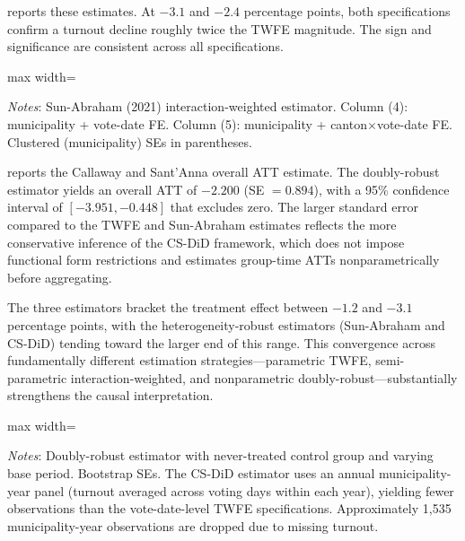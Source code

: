 \documentclass[12pt]{article}
\begin{document}
 reports these estimates. At $-3.1$ and $-2.4$ percentage points, both specifications confirm a turnout decline roughly twice the TWFE magnitude. The sign and significance are consistent across all specifications.

\begin{table}[H]
\centering
\caption{Sun-Abraham Interaction-Weighted Estimates}
\label{tab:sunab}
\begin{adjustbox}{max width=\textwidth}

\end{adjustbox}
\vspace{0.3em}
\parbox{\textwidth}{\footnotesize \textit{Notes}: Sun-Abraham (2021) interaction-weighted estimator. Column (4): municipality + vote-date FE. Column (5): municipality + canton$\times$vote-date FE. Clustered (municipality) SEs in parentheses.}
\end{table}

 reports the Callaway and Sant'Anna overall ATT estimate. The doubly-robust estimator yields an overall ATT of $-2.200$ (SE $= 0.894$), with a 95\% confidence interval of $[-3.951, -0.448]$ that excludes zero. The larger standard error compared to the TWFE and Sun-Abraham estimates reflects the more conservative inference of the CS-DiD framework, which does not impose functional form restrictions and estimates group-time ATTs nonparametrically before aggregating.

The three estimators bracket the treatment effect between $-1.2$ and $-3.1$ percentage points, with the heterogeneity-robust estimators (Sun-Abraham and CS-DiD) tending toward the larger end of this range. This convergence across fundamentally different estimation strategies---parametric TWFE, semi-parametric interaction-weighted, and nonparametric doubly-robust---substantially strengthens the causal interpretation.

\begin{table}[H]
\centering
\caption{Callaway and Sant'Anna (2021) Estimates}
\label{tab:cs_did}
\begin{adjustbox}{max width=\textwidth}

\end{adjustbox}
\vspace{0.3em}
\parbox{\textwidth}{\footnotesize \textit{Notes}: Doubly-robust estimator with never-treated control group and varying base period. Bootstrap SEs. The CS-DiD estimator uses an annual municipality-year panel (turnout averaged across voting days within each year), yielding fewer observations than the vote-date-level TWFE specifications. Approximately 1,535 municipality-year observations are dropped due to missing turnout.}
\end{table}
\end{document}
